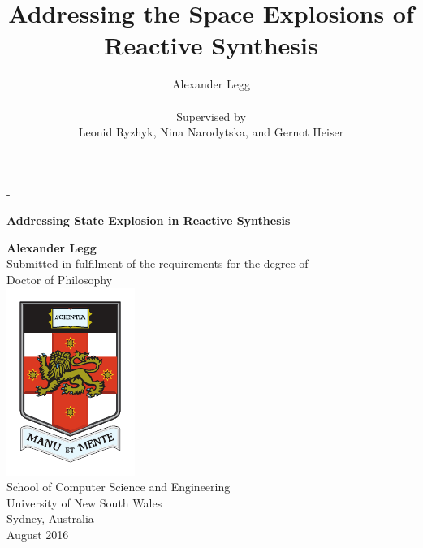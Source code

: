\documentclass[a4paper, twoside, openright, 11pt, oldfontcommands]{memoir}
\title{Addressing the Space Explosions of Reactive Synthesis}
\author{Alexander Legg \\
    \\
    Supervised by \\
Leonid Ryzhyk, Nina Narodytska, and Gernot Heiser}
\begin{document}
\frontmatter

\thispagestyle{empty}

\calccentering{\unitlength}                         %
\begin{adjustwidth*}{\unitlength}{-\unitlength}     %
        \begin{adjustwidth}{-1cm}{-1cm}                 %

\mbox{}
\vfill
\begin{center}
    {\Huge\sffamily\bfseries Addressing State Explosion in Reactive Synthesis\\[2cm]\par}
{\Large\sffamily\bfseries Alexander Legg}\\[1.5cm]
Submitted in fulfilment of the requirements for the degree of \\
Doctor of Philosophy\\[1cm]
\includegraphics[width=0.32\linewidth]{unsw-crest-color-smaller} \\[1cm]
School of Computer Science and Engineering \\[0.5cm]
University of New South Wales \\[0.5cm]
Sydney, Australia \\[1.0cm]
August 2016
\end{center}
\par
\vfill

    \end{adjustwidth}
\end{adjustwidth*}

\clearpage



\setcounter{secnumdepth}{3}
\setcounter{tocdepth}{3}
\tableofcontents
\clearpage
\end{document}
